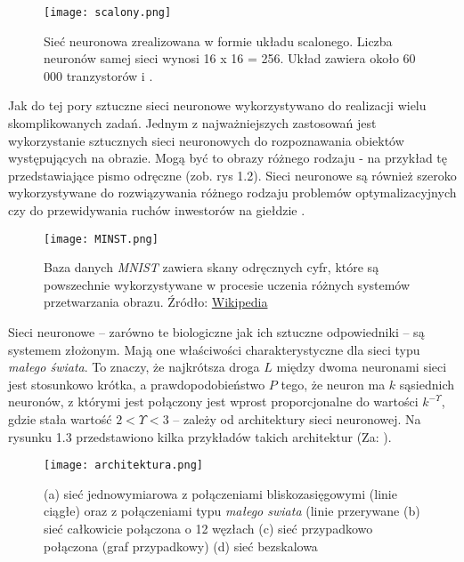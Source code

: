 \begin{figure}[H]
\begin{center}
\texttt{[image: scalony.png]}
\centering
\caption{Sieć neuronowa zrealizowana w formie układu scalonego. Liczba neuronów samej sieci wynosi 16 x 16 = 256. Układ zawiera około 60 000 tranzystorów \citep[s. 14]{Kosinski2017} i \citep{Chua1998}.}
\centering
\end{center}
\end{figure}

Jak do tej pory sztuczne sieci neuronowe wykorzystywano do realizacji wielu skomplikowanych zadań. Jednym z najważniejszych zastosowań jest wykorzystanie sztucznych sieci neuronowych do rozpoznawania obiektów występujących na obrazie. Mogą być to obrazy różnego rodzaju - na przykład tę przedstawiające pismo odręczne (zob. rys 1.2). Sieci neuronowe są również szeroko wykorzystywane do rozwiązywania różnego rodzaju problemów optymalizacyjnych czy do przewidywania ruchów inwestorów na giełdzie \citep[s. 15]{Kosinski2017}.

\begin{figure}[H]
\begin{center}
\texttt{[image: MINST.png]}
\caption{Baza danych \textit{MNIST} zawiera skany odręcznych cyfr, które są powszechnie wykorzystywane w procesie uczenia różnych systemów przetwarzania obrazu. Źródło: \href{https://en.wikipedia.org/wiki/MNIST_database}{Wikipedia}}
\centering
\end{center}
\end{figure}

Sieci neuronowe -- zarówno te biologiczne jak ich sztuczne odpowiedniki -- są systemem złożonym. Mają one właściwości charakterystyczne dla sieci typu \textit{małego świata}. To znaczy, że najkrótsza droga $L$ między dwoma neuronami sieci jest stosunkowo krótka, a prawdopodobieństwo $P$ tego, że neuron ma $k$ sąsiednich neuronów, z którymi jest połączony jest wprost proporcjonalne do wartości $k^{-\Upsilon}$, gdzie stała wartość $2 < \Upsilon < 3$ -- zależy od architektury sieci neuronowej. Na rysunku 1.3 przedstawiono kilka przykładów takich architektur (Za: \citep[s. 15-16]{Kosinski2017}).

\begin{figure}[H]
\texttt{[image: architektura.png]}
\centering
\caption{(a) sieć jednowymiarowa z połączeniami bliskozasięgowymi (linie ciągłe) oraz z połączeniami typu \textit{małego swiata} (linie przerywane (b) sieć całkowicie połączona o 12 węzłach (c) sieć przypadkowo połączona (graf przypadkowy) (d) sieć bezskalowa\protect\footnotemark}
\centering
\end{figure}

